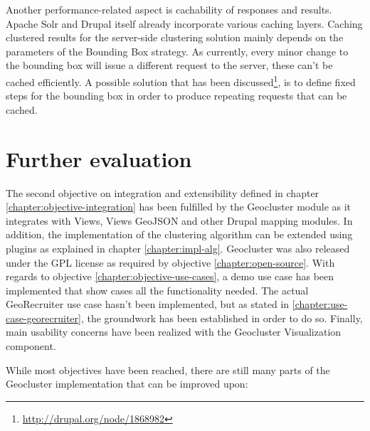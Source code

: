 Another performance-related aspect is cachability of responses and results. Apache Solr and Drupal itself already incorporate various caching layers. Caching clustered results for the server-side clustering solution mainly depends on the parameters of the Bounding Box strategy. As currently, every minor change to the bounding box will issue a different request to the server, these can't be cached efficiently. A possible solution that has been discussed\footnote{\url{http://drupal.org/node/1868982}}, is to define fixed steps for the bounding box in order to produce repeating requests that can be cached.  

\section{Further evaluation}

The second objective on integration and extensibility defined in chapter \ref{chapter:objective-integration} has been fulfilled by the Geocluster module as it integrates with Views, Views GeoJSON and other Drupal mapping modules. In addition, the implementation of the clustering algorithm can be extended using plugins as explained in chapter \ref{chapter:impl-alg}. Geocluster was also released under the GPL license as required by objective \ref{chapter:open-source}. With regards to objective \ref{chapter:objective-use-cases}, a demo use case has been implemented that show cases all the functionality needed. The actual GeoRecruiter use case hasn't been implemented, but as stated in \ref{chapter:use-case-georecruiter}, the groundwork has been established in order to do so. Finally, main usability concerns have been realized with the Geocluster Visualization component.

While most objectives have been reached, there are still many parts of the Geocluster implementation that can be improved upon:

